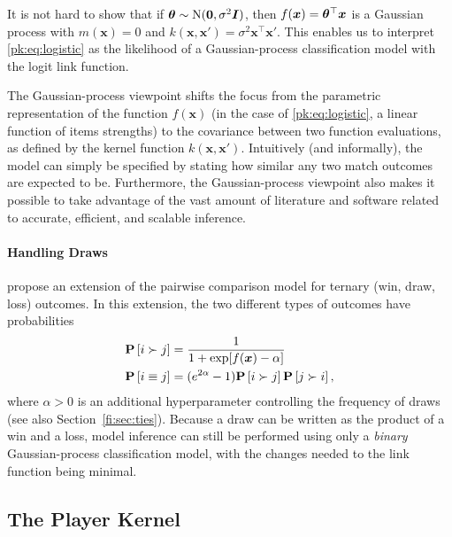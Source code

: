 It is not hard to show that if $\bm{\theta} \sim \mathrm{N}( \bm{0}, \sigma^2 \bm{I} )$, then $f(\bm{x}) = \bm{\theta}^\top \bm{x}$ is a Gaussian process with $m(\bm{x}) = 0$ and $k(\bm{x}, \bm{x}') = \sigma^2 \bm{x}^\top \bm{x}'$.
This enables us to interpret \eqref{pk:eq:logistic} as the likelihood of a Gaussian-process classification model with the logit link function.

The Gaussian-process viewpoint shifts the focus from the parametric representation of the function $f(\bm{x})$ (in the case of \eqref{pk:eq:logistic}, a linear function of items strengths) to the covariance between two function evaluations, as defined by the kernel function $k(\bm{x}, \bm{x}')$.
Intuitively (and informally), the model can simply be specified by stating how similar any two match outcomes are expected to be.
Furthermore, the Gaussian-process viewpoint also makes it possible to take advantage of the vast amount of literature and software related to accurate, efficient, and scalable inference.


\paragraph{Handling Draws}
\citet{rao1967ties} propose an extension of the pairwise comparison model for ternary (win, draw, loss) outcomes.
In this extension, the two different types of outcomes have probabilities
\begin{align*}
\mathbf{P}\left[ i \succ j \right]  &= \frac{1}{1 + \exp[f(\bm{x}) - \alpha]} \\
\mathbf{P}\left[ i \equiv j \right] &= (e^{2 \alpha} - 1) \mathbf{P}\left[ i \succ j \right] \mathbf{P}\left[ j \succ i \right],
\end{align*}
where $\alpha > 0$ is an additional hyperparameter controlling the frequency of draws (see also Section~\ref{fi:sec:ties}).
Because a draw can be written as the product of a win and a loss, model inference can still be performed using only a \emph{binary} Gaussian-process classification model, with the changes needed to the link function being minimal.


\subsection{The Player Kernel}

